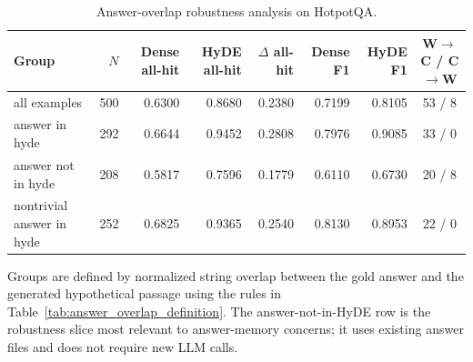 \begin{table}[t]
\centering
\caption{Answer-overlap robustness analysis on HotpotQA.}
\label{tab:hyde_overlap_robustness}
\footnotesize
\begin{threeparttable}
\setlength{\tabcolsep}{3pt}
\begin{tabularx}{\textwidth}{>{\raggedright\arraybackslash}X r r r r r r c}
\toprule
Group & $N$ & Dense all-hit & HyDE all-hit & $\Delta$ all-hit & Dense F1 & HyDE F1 & W$\rightarrow$C / C$\rightarrow$W \\
\midrule
all examples & 500 & 0.6300 & 0.8680 & 0.2380 & 0.7199 & 0.8105 & 53 / 8 \\
answer in hyde & 292 & 0.6644 & 0.9452 & 0.2808 & 0.7976 & 0.9085 & 33 / 0 \\
answer not in hyde & 208 & 0.5817 & 0.7596 & 0.1779 & 0.6110 & 0.6730 & 20 / 8 \\
nontrivial answer in hyde & 252 & 0.6825 & 0.9365 & 0.2540 & 0.8130 & 0.8953 & 22 / 0 \\
\bottomrule
\end{tabularx}
\begin{tablenotes}
\footnotesize
\item Groups are defined by normalized string overlap between the gold answer and the generated hypothetical passage using the rules in Table~\ref{tab:answer_overlap_definition}. The answer-not-in-HyDE row is the robustness slice most relevant to answer-memory concerns; it uses existing answer files and does not require new LLM calls.
\end{tablenotes}
\end{threeparttable}
\end{table}
